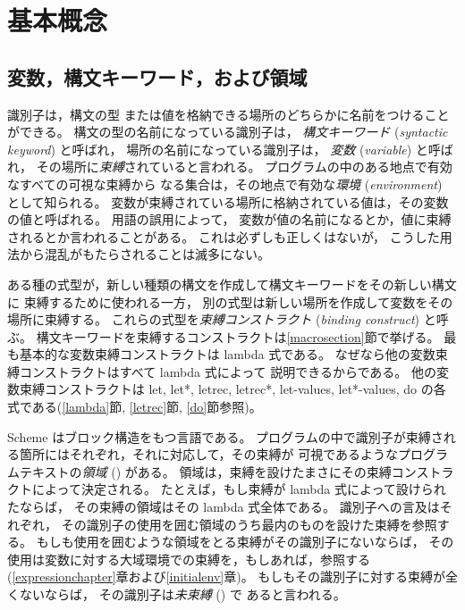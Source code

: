\chapter{基本概念}
\label{basicchapter}

\section{変数，構文キーワード，および領域}
\label{specialformsection}
\label{variablesection}

識別子は，構文の型
または値を格納できる場所のどちらかに名前をつけることができる。
構文の型の名前になっている識別子は，
{\em 構文キーワード} ({\em syntactic
keyword}\/) と呼ばれ，
場所の名前になっている識別子は，
{\em 変数} ({\em variable}\/) と呼ばれ，
その場所に{\em 束縛}されていると言われる。
プログラムの中のある地点で有効なすべての可視な束縛から
なる集合は，その地点で有効な{\em 環境} ({\em environment}\/) として知られる。
変数が束縛されている場所に格納されている値は，その変数の値と呼ばれる。
用語の誤用によって，
変数が値の名前になるとか，値に束縛されるとか言われることがある。
これは必ずしも正しくはないが，
こうした用法から混乱がもたらされることは滅多にない。

\vest ある種の式型が，新しい種類の構文を作成して構文キーワードをその新しい構文に
束縛するために使われる一方，
別の式型は新しい場所を作成して変数をその場所に束縛する。
これらの式型を{\em 束縛コンストラクト} ({\em binding
construct}\/) と呼ぶ。
構文キーワードを束縛するコンストラクトは\ref{macrosection}節で挙げる。
最も基本的な変数束縛コンストラクトは {\cf lambda} 式である。
なぜなら他の変数束縛コンストラクトはすべて {\cf lambda} 式によって
説明できるからである。
他の変数束縛コンストラクトは {\cf let}, {\cf let*}, {\cf letrec},
{\cf letrec*}, {\cf let-values}, {\cf let*-values},
{\cf do} の各式である(\ref{lambda}節, \ref{letrec}節, \ref{do}節参照)。


\vest Scheme はブロック構造をもつ言語である。
プログラムの中で識別子が束縛される箇所にはそれぞれ，それに対応して，その束縛が
可視であるようなプログラムテキストの{\em 領域} (\/) がある。
領域は，束縛を設けたまさにその束縛コンストラクトによって決定される。
たとえば，もし束縛が {\cf lambda} 式によって設けられたならば，
その束縛の領域はその {\cf lambda} 式全体である。
識別子への言及はそれぞれ，
その識別子の使用を囲む領域のうち最内のものを設けた束縛を参照する。
もしも使用を囲むような領域をとる束縛がその識別子にないならば，
その使用は変数に対する大域環境での束縛を，もしあれば，参照する
(\ref{expressionchapter}章および\ref{initialenv}章)。
もしもその識別子に対する束縛が全くないならば，
その識別子は{\em 未束縛} (\/) で
あると言われる。

